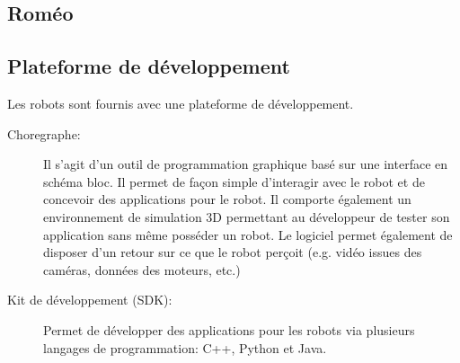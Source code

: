 \subsection{Roméo}
\label{Entreprise: Les produits: Roméo}

\subsection{Plateforme de développement}
\label{Entreprise:Les produits: Nao: Plateforme de développement}
Les robots sont fournis avec une plateforme de développement.
\begin{description}
	\item[Choregraphe:] Il s'agit d'un outil de programmation graphique basé sur une interface en schéma bloc. Il permet de façon simple d'interagir avec le robot et de concevoir des applications pour le robot. Il comporte également un environnement de simulation 3D permettant au développeur de tester son application sans même posséder un robot. Le logiciel permet également de disposer d'un retour sur ce que le robot perçoit (e.g. vidéo issues des caméras, données des moteurs, etc.)
	
	\item[Kit de développement (SDK):] Permet de développer des applications pour les robots via plusieurs langages de programmation:  C++, Python et Java.
\end{description}


